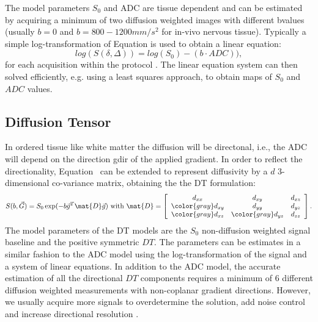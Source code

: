 The model parameters $S_0$ and \gls{ADC} are tissue dependent and can be estimated by acquiring a minimum of two diffusion weighted images with different {\glspl{bvalue}} (usually $b=0$ and $b=800-1200mm/s^2$ for in-vivo nervous tissue). Typically a simple log-transformation of Equation \label{eq:chapter 2 adc} is used to obtain a linear equation:
\begin{equation}
	log(S(\delta,\Delta)) = log(S_{0}) - (b\cdot ADC)),
    \label{eq:chapter 2 adc}
\end{equation}
for each acquisition within the protocol \prot{}. The linear equation system can then solved efficiently, e.g. using a least squares approach, to obtain maps of $S_0$ and $ADC$ values.

\subsection{Diffusion Tensor}
\label{subsec:dti}
In ordered tissue like white matter the diffusion will be directonal, i.e., the \gls{ADC} will depend on the direction {\gls{gdir}} of the applied gradient. In order to reflect the directionality, Equation~\label{eq:chapter 2 adc} can be extended to represent diffusivity by a $d$ 3-dimensional co-variance matrix\citep{Basses:1994}, obtaining the the {\gls{DT}} formulation:
\begin{equation}
	S(b,\vec{G}) = S_{0}\exp(-b\vec{g}^T \mat{D}\vec{g}) \mbox{ with } \mat{D} = 
	\left[
	\begin{array}{ccc}
	d_{xx} & d_{xy} & d_{xz} \\
	{\color{gray} d_{xy}} & d_{yy} & d_{yz} \\
	{\color{gray} d_{xz}} & {\color{gray} d_{yz}} & d_{zz} 	
	\end{array} \right].	
    \label{eq:dti}
\end{equation}
The model parameters of the {\gls{DT}} models are the $S_0$ non-diffusion weighted signal baseline and the positive symmetric $DT$. The parameters can be estimates in a similar fashion to the ADC model using the log-transformation of the signal and a system of linear equations. In addition to the ADC model, the accurate estimation of all the directional $DT$ components requires a minimum of 6 different diffusion weighted measurements with non-coplanar gradient directions. However, we usually acquire more signals to overdetermine the solution, add noise control and increase directional resolution \citep{Jones:2004a}.


